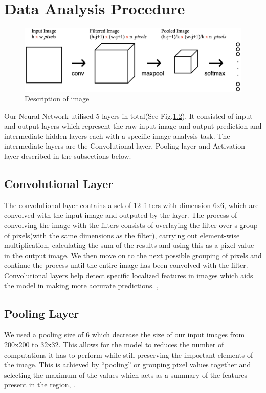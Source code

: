 \documentclass[conference]{IEEEtran}
\begin{document}
\section{Data Analysis Procedure}


\begin{figure}
  \centering
  \includegraphics[scale=0.3]{images/CNN_layers.png}
  \caption{Description of image}
\end{figure}
\indent Our Neural Network utilised 5 layers in total(See Fig.\ref{}). It consisted of input and output layers which represent the raw input image and output prediction and intermediate hidden layers each with a specific image analysis task. The intermediate layers are the Convolutional layer, Pooling layer and Activation layer described in the subsections below.\\
\subsection{Convolutional Layer}
The convolutional layer contains a set of 12 filters with dimension 6x6,  which are convolved with the input image and outputed by the layer. The process of convolving the image with the filters consists of overlaying the filter over s group of pixels(with the same dimensions as the filter), carrying out element-wise multiplication, calculating the sum of the results and using this as a pixel value in the output image. We then move on to the next possible grouping of pixels and continue the process until the entire image has been convolved with the filter. Convolutional layers help detect specific localized features in images which aids the model in making more accurate predictions.
, \cite{CNNPart1_VZ_2019}
\subsection{Pooling Layer}
We used a pooling size of 6 which decrease the size of  our input images from 200x200 to 32x32. This allows for the model to reduces the number of computations it has to perform while still preserving the important elements of the image. This is achieved by “pooling” or grouping pixel values together and selecting the maximum of the values which acts as a summary of the features present in the region, \cite{CNNPart1_VZ_2019}.
\end{document}

